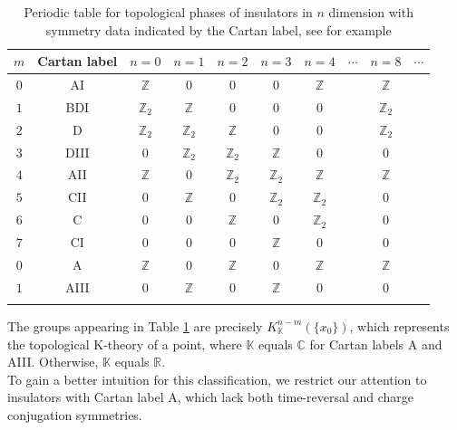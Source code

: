 \begin{table}[h!]
\begin{tabular}{cccccccccc}
  \hline
  $m$
  &
  Cartan label
  &
  $n=0$
  &
  $n=1$
  &
  $n=2$
  &
  $n=3$
  &
  $n=4$
  &
  $\cdots$
  &
  $n=8$
  &
  $\cdots$
  \\
  \hline
  $0$
  &
  AI
  &
  $\mathbb{Z}$
  &
  $0$
  &
  $0$
  &
  $0$
  &
  $\mathbb{Z}$
  &
  &
  $\mathbb{Z}$
  &
  \\
  $1$
  &
  BDI
  &
  $\mathbb{Z}_{2}$
  &
  $\mathbb{Z}$
  &
  $0$
  &
  $0$
  &
  $0$
  &
  &
  $\mathbb{Z}_{2}$
  &
  \\
  $2$
  &
  D
  &
  $\mathbb{Z}_{2}$
  &
  $\mathbb{Z}_{2}$
  &
  $\mathbb{Z}$
  &
  $0$
  &
  $0$
  &
  &
  $\mathbb{Z}_{2}$
  &
  \\
  $3$
  &
  DIII
  &
  $0$
  &
  $\mathbb{Z}_{2}$
  &
  $\mathbb{Z}_{2}$
  &
  $\mathbb{Z}$
  &
  $0$
  &
  &
  $0$
  &
  \\
  $4$
  &
  AII
  &
  $\mathbb{Z}$
  &
  $0$
  &
  $\mathbb{Z}_{2}$
  &
  $\mathbb{Z}_{2}$
  &
  $\mathbb{Z}$
  &
  &
  $\mathbb{Z}$
  &
  \\
  $5$
  &
  CII
  &
  $0$
  &
  $\mathbb{Z}$
  &
  $0$
  &
  $\mathbb{Z}_{2}$
  &
  $\mathbb{Z}_{2}$
  &
  &
  $0$
  &
  \\
  $6$
  &
  C
  &
  $0$
  &
  $0$
  &
  $\mathbb{Z}$
  &
  $0$
  &
  $\mathbb{Z}_{2}$
  &
  &
  $0$
  &
  \\
  $7$
  &
  CI
  &
  $0$
  &
  $0$
  &
  $0$
  &
  $\mathbb{Z}$
  &
  $0$
  &
  &
  $0$
  &
  \\
  \hline
  \hline
  $0$
  &
  A
  &
  $\mathbb{Z}$
  &
  $0$
  &
  $\mathbb{Z}$
  &
  $0$
  &
  $\mathbb{Z}$
  &
  &
  $\mathbb{Z}$
  &
  \\
  $1$
  &
  AIII
  &
  $0$
  &
  $\mathbb{Z}$
  &
  $0$
  &
  $\mathbb{Z}$
  &
  $0$
  &
  &
  $0$
  \\
  \hline
  \\
\end{tabular}
\caption{Periodic table for topological phases of insulators in $n$ dimension with symmetry data indicated by the Cartan label, see \cite{9104a30f} for example}
\label{tab:pt}
\end{table}
The groups appearing in Table \ref{tab:pt} are precisely $K_{\mathbb{K}}^{n-m}(\lbrace x_{0} \rbrace)$, which represents the topological K-theory of a point, where $\mathbb{K}$ equals $\mathbb{C}$ for Cartan labels A and AIII.
Otherwise, $\mathbb{K}$ equals $\mathbb{R}$.
\\
To gain a better intuition for this classification, we restrict our attention to insulators with Cartan label A, which lack both time-reversal and charge conjugation symmetries.
